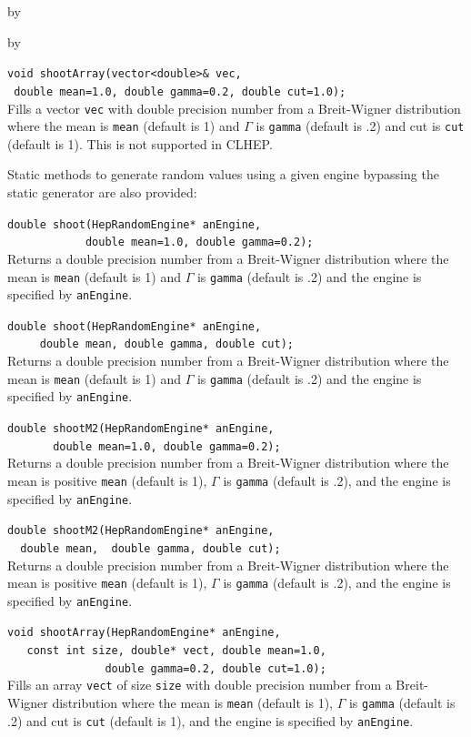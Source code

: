 \documentclass[twoside]{article}
\newcommand{\comp}[1]{\texttt{#1}}%
\newcommand{\entrylabel}[1]{\mbox{\textbf{{#1}}}\hfil}%
\newenvironment{entry}
{\begin{list}{}%
    {\renewcommand{\makelabel}{\entrylabel}%
     \setlength{\labelwidth}{90pt}%
     \setlength{\leftmargin}{\labelwidth}
     \advance\leftmargin by \labelsep%
      }%
    }%
  {\end{list}}
\newcommand{\Entrylabel}[1]%
{\raisebox{0pt}[1ex][0pt]{\makebox[\labelwidth][l]%
    {\parbox[t]{\labelwidth}{\hspace{0pt}\textbf{{#1}}}}}}
\newenvironment{Entry}%
{\renewcommand{\entrylabel}{\Entrylabel}\begin{entry}}%
  {\end{entry}}
\begin{document}
\begin{description}
\begin{Entry}
\begin{Entry}
    \verb+void shootArray(vector<double>& vec,+\\
    \verb+ double mean=1.0, double gamma=0.2, double cut=1.0);+\\
    Fills a vector \comp{vec} with double
    precision number from a Breit-Wigner
    distribution where the mean is \comp{mean} (default is 1)
    and $\Gamma$ is \comp{gamma} (default is .2) and cut is
    \comp{cut} (default is 1).  This is not supported in CLHEP.
    
    Static methods to generate random values using a given engine
    bypassing the static generator are also provided:

    \verb+double shoot(HepRandomEngine* anEngine,+\\
    \verb+            double mean=1.0, double gamma=0.2);+\\
    Returns a double precision number from a Breit-Wigner
    distribution where the mean is \comp{mean} (default is 1)
    and $\Gamma$ is \comp{gamma} (default is .2) and the engine
    is specified by \comp{anEngine}.
    
    \verb+double shoot(HepRandomEngine* anEngine,+\\
    \verb+     double mean, double gamma, double cut);+\\
    Returns a double precision number from a Breit-Wigner
    distribution where the mean is \comp{mean} (default is 1)
    and $\Gamma$ is \comp{gamma} (default is .2) and the engine
    is specified by \comp{anEngine}.
    
    \verb+double shootM2(HepRandomEngine* anEngine,+\\
    \verb+       double mean=1.0, double gamma=0.2);+\\
    Returns a double precision number from a Breit-Wigner
    distribution where the mean is positive \comp{mean} (default is 1),
    $\Gamma$ is \comp{gamma} (default is .2), and the engine
    is specified by \comp{anEngine}.
    
    \verb+double shootM2(HepRandomEngine* anEngine,+\\
    \verb+  double mean,  double gamma, double cut);+\\
    Returns a double precision number from a Breit-Wigner
    distribution where the mean is positive \comp{mean} (default is 1),
    $\Gamma$ is \comp{gamma} (default is .2), and the engine
    is specified by \comp{anEngine}.
    
    \verb+void shootArray(HepRandomEngine* anEngine,+\\
    \verb+   const int size, double* vect, double mean=1.0,+\\
    \verb+               double gamma=0.2, double cut=1.0);+\\
    Fills an array \comp{vect} of size \comp{size} with double
    precision number from a Breit-Wigner
    distribution where the mean is \comp{mean} (default is 1),
    $\Gamma$ is \comp{gamma} (default is .2) and cut is
    \comp{cut} (default is 1), and the engine is specified
    by \comp{anEngine}.


\end{Entry}
\end{Entry}
\end{description}
\end{document}
